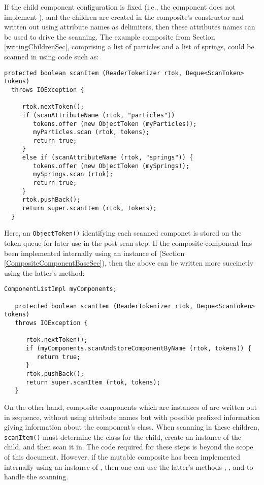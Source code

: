 \documentclass{article}
\begin{document}
If the child component configuration is fixed
(i.e., the component
does not implement
),
and the children are created in the composite's constructor
and written out using attribute names as delimiters,
then these attributes names can be used to drive the scanning.
The example composite from Section \ref{writingChildrenSec},
comprising a list of particles and a list of springs, 
could be scanned in using code such as:
\begin{lstlisting}[]
  protected boolean scanItem (ReaderTokenizer rtok, Deque<ScanToken> tokens)
  throws IOException {

     rtok.nextToken();
     if (scanAttributeName (rtok, "particles")) 
        tokens.offer (new ObjectToken (myParticles));
        myParticles.scan (rtok, tokens);
        return true;
     }
     else if (scanAttributeName (rtok, "springs")) {
        tokens.offer (new ObjectToken (mySprings));
        mySprings.scan (rtok);
        return true;
     }
     rtok.pushBack();     
     return super.scanItem (rtok, tokens);
  }
\end{lstlisting}
Here, an {\tt ObjectToken()} identifying each scanned componet is
stored on the token queue for later use in the post-scan step.  If the
composite component has been implemented internally using an instance
of  (Section
\ref{CompositeComponentBaseSec}), then the above can be written more
succinctly using the latter's
method:
\begin{lstlisting}[]
   ComponentListImpl myComponents; 

   protected boolean scanItem (ReaderTokenizer rtok, Deque<ScanToken> tokens)
   throws IOException {

      rtok.nextToken();
      if (myComponents.scanAndStoreComponentByName (rtok, tokens)) {
         return true;
      }
      rtok.pushBack();     
      return super.scanItem (rtok, tokens);
   }
\end{lstlisting}

On the other hand, composite components which are instances of
 are
written out in sequence, without using attribute names but with
possible prefixed information giving information about the component's
class. When scanning in these children, {\tt scanItem()} must
determine the class for the child, create an instance of the child,
and then scan it in. The code required for these steps is beyond the
scope of this document. However, if the mutable composite
has been implemented internally using an instance of
, then one can
use the latter's methods 
,
,
and 
to handle the scanning.
\end{document}
